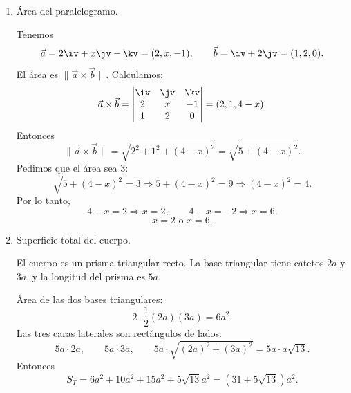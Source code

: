 \begin{enumerate}[\hspace{-3mm}$1)$]
\item Área del paralelogramo.
\begin{sol}
Tenemos
\[
\vec a=2\iv+x\jv-\kv=(2,x,-1),
\qquad
\vec b=\iv+2\jv=(1,2,0).
\]
El área es $\|\vec a\times\vec b\|$. Calculamos:
\[
\vec a\times\vec b=
\begin{vmatrix}
\iv&\jv&\kv\\
2&x&-1\\
1&2&0
\end{vmatrix}
=(2,1,4-x).
\]
Entonces
\[
\|\vec a\times\vec b\|=\sqrt{2^2+1^2+(4-x)^2}=\sqrt{5+(4-x)^2}.
\]
Pedimos que el área sea $3$:
\[
\sqrt{5+(4-x)^2}=3
\Rightarrow 5+(4-x)^2=9
\Rightarrow (4-x)^2=4.
\]
Por lo tanto,
\[
4-x=2\Rightarrow x=2,
\qquad
4-x=-2\Rightarrow x=6.
\]
\[
\boxed{x=2\text{ o }x=6.}
\]
\end{sol}

\item Superficie total del cuerpo.
\begin{sol}
El cuerpo es un prisma triangular recto. La base triangular tiene catetos $2a$ y $3a$, y la longitud del prisma es $5a$.

\begin{center}
\end{center}

Área de las dos bases triangulares:
\[
2\cdot\frac12(2a)(3a)=6a^2.
\]
Las tres caras laterales son rectángulos de lados:
\[
5a\cdot2a,\qquad 5a\cdot3a,\qquad 5a\cdot \sqrt{(2a)^2+(3a)^2}=5a\cdot a\sqrt{13}.
\]
Entonces
\[
S_T=6a^2+10a^2+15a^2+5\sqrt{13}a^2=(31+5\sqrt{13})a^2.
\]
\end{sol}


\end{enumerate}
